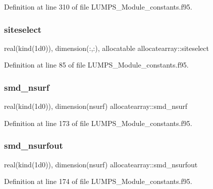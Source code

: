 Definition at line 310 of file L\+U\+M\+P\+S\+\_\+\+Module\+\_\+constants.\+f95.

\mbox{\label{namespaceallocatearray_a08dfc69cdb208d383ab68d12d7424eb9}} 
\subsubsection{\texorpdfstring{siteselect}{siteselect}}
{\footnotesize\ttfamily real(kind(1d0)), dimension(\+:,\+:), allocatable allocatearray\+::siteselect}



Definition at line 85 of file L\+U\+M\+P\+S\+\_\+\+Module\+\_\+constants.\+f95.

\mbox{\label{namespaceallocatearray_a1dcc99b13956867bdc2a58c234193a2e}} 
\subsubsection{\texorpdfstring{smd\+\_\+nsurf}{smd\_nsurf}}
{\footnotesize\ttfamily real(kind(1d0)), dimension(nsurf) allocatearray\+::smd\+\_\+nsurf}



Definition at line 173 of file L\+U\+M\+P\+S\+\_\+\+Module\+\_\+constants.\+f95.

\mbox{\label{namespaceallocatearray_a332b5e58530f77936db6b394822768c9}} 
\subsubsection{\texorpdfstring{smd\+\_\+nsurfout}{smd\_nsurfout}}
{\footnotesize\ttfamily real(kind(1d0)), dimension(nsurf) allocatearray\+::smd\+\_\+nsurfout}



Definition at line 174 of file L\+U\+M\+P\+S\+\_\+\+Module\+\_\+constants.\+f95.

\mbox{\label{namespaceallocatearray_aacffb567ae9e14682180226d82bc8c62}} 
